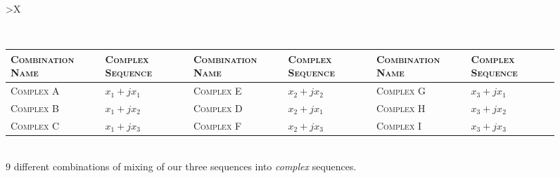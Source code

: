 \documentclass[../../course]{subfiles}
\begin{document}
\begin{figure} [H]
    \centering

    \begin{tabularx} {\textwidth} {
            *{1}{>{\centering\arraybackslash}X}
        }

        \\

        { \begin{tabularx} {\textwidth} {
                *{6}{>{\centering\arraybackslash}X}
            }

            \toprule
            \textsc{Combination Name} & \textsc{Complex Sequence} &
            \textsc{Combination Name} & \textsc{Complex Sequence} &
            \textsc{Combination Name} & \textsc{Complex Sequence} \\
            \midrule

            \textsc{Complex A} & $x_{1} + j x_{1}$ &
            \textsc{Complex E} & $x_{2} + j x_{2}$ &
            \textsc{Complex G} & $x_{3} + j x_{1}$ \\

            \textsc{Complex B} & $x_{1} + j x_{2}$ &
            \textsc{Complex D} & $x_{2} + j x_{1}$ &
            \textsc{Complex H} & $x_{3} + j x_{2}$ \\

            \textsc{Complex C} & $x_{1} + j x_{3}$ &
            \textsc{Complex F} & $x_{2} + j x_{3}$ &
            \textsc{Complex I} & $x_{3} + j x_{3}$ \\

            \bottomrule

        \end{tabularx} } \\

         {
            $9$ different combinations of mixing of our three sequences into \emph{complex}
            sequences.
        }
        \\


    \end{tabularx}

\end{figure}

\end{document}
